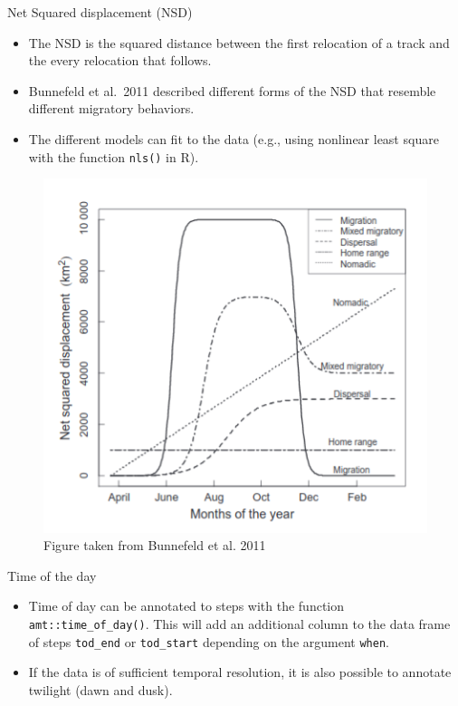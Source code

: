 \documentclass[ignorenonframetext,,t]{beamer}
\providecommand{\tightlist}{%
\setlength{\itemsep}{0pt}\setlength{\parskip}{0pt}}
\providecommand{\tightlist}{%
\setlength{\itemsep}{0pt}\setlength{\parskip}{0pt}}
\renewcommand{\tightlist}{\setlength{\itemsep}{1.4ex}\setlength{\parskip}{0pt}}
\begin{document}
\begin{frame}[fragile]{Net Squared displacement (NSD)}
\label{net-squared-displacement-nsd}
\begin{itemize}
\tightlist
\item
  The NSD is the squared distance between the first relocation of a
  track and the every relocation that follows.
\item
  Bunnefeld et al.~2011 described different forms of the NSD that
  resemble different migratory behaviors.
\item
  The different models can fit to the data (e.g., using nonlinear least
  square with the function \texttt{nls()} in R).
\end{itemize}
\end{frame}

\begin{frame}
\begin{figure}

{\centering \includegraphics[width=0.6\linewidth]{img/nsd} 

}

\caption{Figure taken from Bunnefeld et al. 2011}\label{fig:unnamed-chunk-12}
\end{figure}
\end{frame}

\begin{frame}[fragile]{Time of the day}
\label{time-of-the-day}
\begin{itemize}
\tightlist
\item
  Time of day can be annotated to steps with the function
  \texttt{amt::time\_of\_day()}. This will add an additional column to
  the data frame of steps \texttt{tod\_end} or \texttt{tod\_start}
  depending on the argument \texttt{when}.
\item
  If the data is of sufficient temporal resolution, it is also possible
  to annotate twilight (dawn and dusk).
\end{itemize}
\end{frame}
\end{document}
